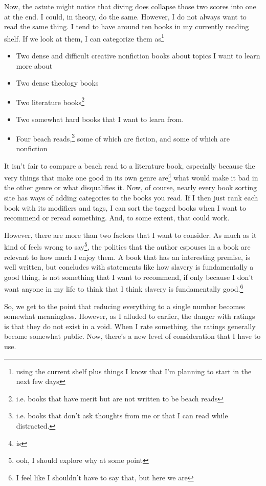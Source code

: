 \documentclass[12pt]{article}[titlepage]
\newcommand{\1}{\={a}}
\newcommand{\2}{\={e}}
\newcommand{\3}{\={\i}}
\newcommand{\4}{\=o}
\newcommand{\5}{\=u}
\newcommand{\6}{\={A}}
\renewcommand{\,}{\textsuperscript{,}}
\begin{document}
Now, the astute might notice that diving does collapse those two scores into one at the end.
I could, in theory, do the same.
However, I do not always want to read the same thing.
I tend to have around ten books in my currently reading shelf.
If we look at them, I can categorize them as\footnote{using the current shelf plus things I know that I'm planning to start in the next few days}
\begin{itemize}
\item Two dense and difficult creative nonfiction books about topics I want to learn more about
\item Two dense theology books
\item Two literature books\footnote{i.e. books that have merit but are not written to be beach reads}
\item Two somewhat hard books that I want to learn from.
\item Four beach reads,\footnote{i.e. books that don't ask thoughts from me or that I can read while distracted.} some of which are fiction, and some of which are nonfiction
\end{itemize}

It isn't fair to compare a beach read to a literature book, especially because the very things that make one good in its own genre are\footnote{is} what would make it bad in the other genre or what disqualifies it.
Now, of course, nearly every book sorting site has ways of adding categories to the books you read.
If I then just rank each book with its modifiers and tags, I can sort the tagged books when I want to recommend or reread something.
And, to some extent, that could work.

However, there are more than two factors that I want to consider.
As much as it kind of feels wrong to say\footnote{ooh, I should explore why at some point}, the politics that the author espouses in a book are relevant to how much I enjoy them.
A book that has an interesting premise, is well written, but concludes with statements like how slavery is fundamentally a good thing, is not something that I want to recommend, if only because I don't want anyone in my life to think that I think slavery is fundamentally good.\footnote{I feel like I shouldn't have to say that, but here we are}

So, we get to the point that reducing everything to a single number becomes somewhat meaningless.
However, as I alluded to earlier, the danger with ratings is that they do not exist in a void.
When I rate something, the ratings generally become somewhat public.
Now, there's a new level of consideration that I have to use.
\end{document}
